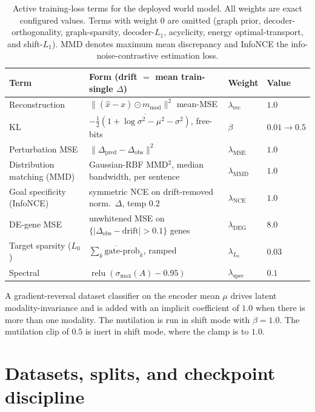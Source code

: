 \begin{table}[h]\centering\footnotesize
\caption{Active training-loss terms for the deployed world model. All weights are exact
configured values. Terms with weight $0$ are omitted (graph prior, decoder-orthogonality,
graph-sparsity, decoder-$L_1$, acyclicity, energy optimal-transport, and shift-$L_1$).
MMD denotes maximum mean discrepancy and InfoNCE the info-noise-contrastive estimation
loss.}
\label{tab:loss_terms}
\begin{tabular}{@{}llll@{}}
\toprule
Term & Form (drift $=$ mean train-single $\Delta$) & Weight & Value \\
\midrule
Reconstruction & $\lVert (\hat{x}-x)\odot m_{\mathrm{mod}}\rVert^2$ mean-MSE & $\lambda_{\mathrm{rec}}$ & $1.0$ \\
KL & $-\tfrac12\overline{(1+\log\sigma^2-\mu^2-\sigma^2)}$, free-bits & $\beta$ & $0.01\!\to\!0.5$ \\
Perturbation MSE & $\lVert \Delta_{\mathrm{pred}}-\Delta_{\mathrm{obs}}\rVert^2$ & $\lambda_{\mathrm{MSE}}$ & $1.0$ \\
Distribution matching (MMD) & Gaussian-RBF MMD$^2$, median bandwidth, per sentence & $\lambda_{\mathrm{MMD}}$ & $1.0$ \\
Goal specificity (InfoNCE) & symmetric NCE on drift-removed norm.\ $\Delta$, temp $0.2$ & $\lambda_{\mathrm{NCE}}$ & $1.0$ \\
DE-gene MSE & unwhitened MSE on $\{|\Delta_{\mathrm{obs}}{-}\mathrm{drift}|{>}0.1\}$ genes & $\lambda_{\mathrm{DEG}}$ & $8.0$ \\
Target sparsity ($L_0$) & $\overline{\sum_k \text{gate-prob}_k}$, ramped & $\lambda_{L_0}$ & $0.03$ \\
Spectral & $\operatorname{relu}(\sigma_{\max}(A)-0.95)$ & $\lambda_{\mathrm{spec}}$ & $0.1$ \\
\bottomrule
\end{tabular}
\end{table}

A gradient-reversal dataset classifier on the encoder mean $\mu$ drives latent
modality-invariance and is added with an implicit coefficient of $1.0$ when there is more
than one modality. The mutilation is run in shift mode with $\beta{=}1.0$. The mutilation
clip of $0.5$ is inert in shift mode, where the clamp is to $1.0$.

\section{Datasets, splits, and checkpoint discipline}\label{app:data}
